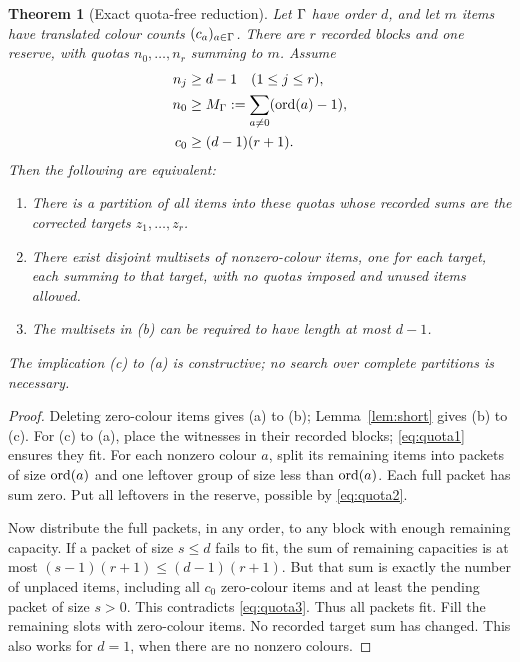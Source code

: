 \documentclass[11pt]{article}
\newtheorem{theorem}{Theorem}[section]
\theoremstyle{remark}\newtheorem{remark}[theorem]{Remark}
\begin{document}
\begin{theorem}[Exact quota-free reduction]\label{thm:packing}
Let $\Gamma$ have order $d$, and let $m$ items have translated colour counts $(c_a)_{a\in\Gamma}$. There are $r$ recorded blocks and one reserve, with quotas $n_0,\ldots,n_r$ summing to $m$. Assume
\begin{align}
 n_j&\ge d-1\quad(1\le j\le r),\label{eq:quota1}\\
 n_0&\ge M_\Gamma:=\sum_{a\ne0}(\operatorname{ord}(a)-1),\label{eq:quota2}\\
 c_0&\ge (d-1)(r+1).\label{eq:quota3}
\end{align}
Then the following are equivalent:
\begin{enumerate}[label=(\alph*)]
\item There is a partition of all items into these quotas whose recorded sums are the corrected targets $z_1,\ldots,z_r$.
\item There exist disjoint multisets of nonzero-colour items, one for each target, each summing to that target, with no quotas imposed and unused items allowed.
\item The multisets in (b) can be required to have length at most $d-1$.
\end{enumerate}
The implication (c) to (a) is constructive; no search over complete partitions is necessary.
\end{theorem}
\begin{proof}
Deleting zero-colour items gives (a) to (b); Lemma~\ref{lem:short} gives (b) to (c). For (c) to (a), place the witnesses in their recorded blocks; \eqref{eq:quota1} ensures they fit. For each nonzero colour $a$, split its remaining items into packets of size $\operatorname{ord}(a)$ and one leftover group of size less than $\operatorname{ord}(a)$. Each full packet has sum zero. Put all leftovers in the reserve, possible by \eqref{eq:quota2}.

Now distribute the full packets, in any order, to any block with enough remaining capacity. If a packet of size $s\le d$ fails to fit, the sum of remaining capacities is at most $(s-1)(r+1)\le(d-1)(r+1)$. But that sum is exactly the number of unplaced items, including all $c_0$ zero-colour items and at least the pending packet of size $s>0$. This contradicts \eqref{eq:quota3}. Thus all packets fit. Fill the remaining slots with zero-colour items. No recorded target sum has changed. This also works for $d=1$, when there are no nonzero colours.
\end{proof}
\end{document}
